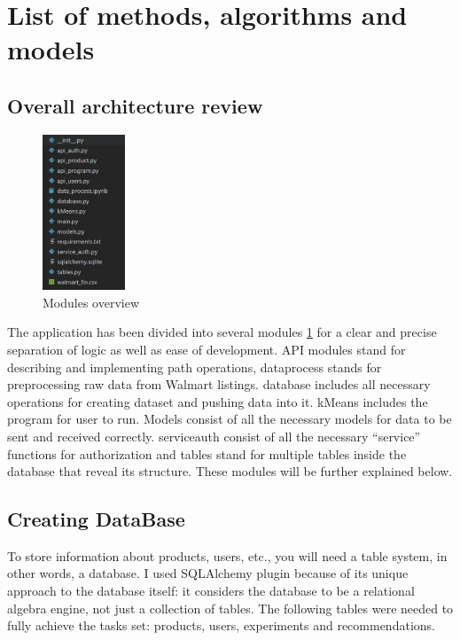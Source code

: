 \documentclass[twoside,twocolumn]{article}
\begin{document}

\section{List of methods, algorithms and models}

\subsection{Overall architecture review}

\begin{figure}
\includegraphics[width=0.22\textwidth]{images/methods.jpg}
\caption{Modules overview}
\label{fig:methods}
\end{figure}
The application has been divided into
several modules \ref{fig:methods} for a clear and
precise separation of logic as well as
ease of development. API modules
stand for describing and
implementing path operations,
dataprocess stands for
preprocessing raw data from Walmart
listings. database includes all
necessary operations for creating
dataset and pushing data into it.
kMeans includes the program for
user to run. Models consist of all the
necessary models for data to be sent
and received correctly. serviceauth
consist of all the necessary “service”
functions for authorization and tables
stand for multiple tables inside the
database that reveal its structure.
These modules will be further
explained below.

\subsection{Creating DataBase}

To store information about products, users, etc., you will need a table
system, in other words, a database. I used SQLAlchemy plugin because
of its unique approach to the database itself: it considers the database to
be a relational algebra engine, not just a collection of tables. The
following tables were needed to fully achieve the tasks set: products,
users, experiments and recommendations.
\end{document}
